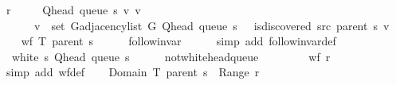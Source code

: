 \begin{isabellebody}
\ {\isacharquery}{\kern0pt}r\ {\isacharequal}{\kern0pt}\isanewline
\ \ \ \ {\isachardoublequoteopen}{\isacharbraceleft}{\kern0pt}{\isacharparenleft}{\kern0pt}Q{\isacharunderscore}{\kern0pt}head\ {\isacharparenleft}{\kern0pt}queue\ s{\isacharparenright}{\kern0pt}{\isacharcomma}{\kern0pt}\ v{\isacharparenright}{\kern0pt}\ {\isacharbar}{\kern0pt}v{\isachardot}{\kern0pt}\isanewline
\ \ \ \ \ \ v\ {\isasymin}\ set\ {\isacharparenleft}{\kern0pt}G{\isachardot}{\kern0pt}adjacency{\isacharunderscore}{\kern0pt}list\ G\ {\isacharparenleft}{\kern0pt}Q{\isacharunderscore}{\kern0pt}head\ {\isacharparenleft}{\kern0pt}queue\ s{\isacharparenright}{\kern0pt}{\isacharparenright}{\kern0pt}{\isacharparenright}{\kern0pt}\ {\isasymand}\ {\isasymnot}\ is{\isacharunderscore}{\kern0pt}discovered\ src\ {\isacharparenleft}{\kern0pt}parent\ s{\isacharparenright}{\kern0pt}\ v{\isacharbraceright}{\kern0pt}{\isachardoublequoteclose}\isanewline
\ \ \isamarkupfalse%
\ {\isachardoublequoteopen}wf\ {\isacharparenleft}{\kern0pt}T\ {\isacharparenleft}{\kern0pt}parent\ s{\isacharparenright}{\kern0pt}{\isacharparenright}{\kern0pt}{\isachardoublequoteclose}\isanewline
\ \ \ \ \isamarkupfalse%
\ follow{\isacharunderscore}{\kern0pt}invar\isanewline
\ \ \ \ \isamarkupfalse%
\ {\isacharparenleft}{\kern0pt}simp\ add{\isacharcolon}{\kern0pt}\ follow{\isacharunderscore}{\kern0pt}invar{\isacharunderscore}{\kern0pt}def{\isacharparenright}{\kern0pt}\isanewline
\ \ \isamarkupfalse%
\ {\isachardoublequoteopen}{\isasymnot}\ white\ s\ {\isacharparenleft}{\kern0pt}Q{\isacharunderscore}{\kern0pt}head\ {\isacharparenleft}{\kern0pt}queue\ s{\isacharparenright}{\kern0pt}{\isacharparenright}{\kern0pt}{\isachardoublequoteclose}\isanewline
\ \ \ \ \isamarkupfalse%
\ not{\isacharunderscore}{\kern0pt}white{\isacharunderscore}{\kern0pt}head{\isacharunderscore}{\kern0pt}queue\isanewline
\ \ \ \ \isacommand{{\isachardot}{\kern0pt}}\isamarkupfalse%
\isanewline
\ \ \isamarkupfalse%
\ {\isachardoublequoteopen}wf\ {\isacharquery}{\kern0pt}r{\isachardoublequoteclose}\isanewline
\ \ \ \ \isamarkupfalse%
\ {\isacharparenleft}{\kern0pt}simp\ add{\isacharcolon}{\kern0pt}\ wf{\isacharunderscore}{\kern0pt}def{\isacharparenright}{\kern0pt}\isanewline
\ \ \isamarkupfalse%
\ {\isachardoublequoteopen}Domain\ {\isacharparenleft}{\kern0pt}T\ {\isacharparenleft}{\kern0pt}parent\ s{\isacharparenright}{\kern0pt}{\isacharparenright}{\kern0pt}\ {\isasyminter}\ Range\ {\isacharquery}{\kern0pt}r\ {\isacharequal}{\kern0pt}\ {\isacharbraceleft}{\kern0pt}{\isacharbraceright}{\kern0pt}{\isachardoublequoteclose}\isanewline

\end{isabellebody}
